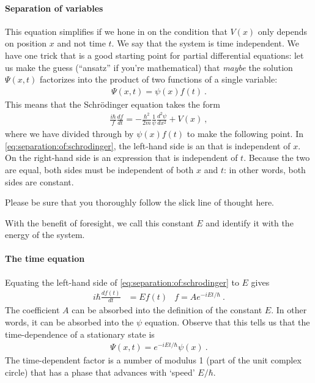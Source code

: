 \paragraph{Separation of variables} This equation simplifies if we hone in on the condition that $V(x)$ only depends on position $x$ and not time $t$. We say that the system is time independent. We have one trick that is a good starting point for partial differential equations: let us make the guess (``ansatz'' if you're mathematical) that \emph{maybe} the solution $\Psi(x,t)$ factorizes into the product of two functions of a single variable:
\begin{align}
    \Psi(x,t) = \psi(x) f(t) \ .
\end{align}
This means that the Schr\"odinger equation takes the form
\begin{align}
    \frac{i\hbar}{f}\frac{df}{dt} = -\frac{\hbar^2}{2m} \frac{1}{\psi}\frac{d^2\psi}{dx^2} + V(x) \ ,
    \label{eq:separation:of:schrodinger}
\end{align}
where we have divided through by  $\psi(x)f(t)$ to make the following point. In \eqref{eq:separation:of:schrodinger}, the left-hand side is an that is independent of $x$. On the right-hand side is an expression that is independent of $t$. Because the two are equal, both sides must be independent of both $x$ and $t$: in other words, both sides are constant. 
\begin{bigidea}
Please be sure that you thoroughly follow the slick line of thought here. 
\end{bigidea}
With the benefit of foresight, we call this constant $E$ and identify it with the energy of the system. 

\paragraph{The time equation} Equating the left-hand side of \eqref{eq:separation:of:schrodinger} to $E$ gives
\begin{align}
    i\hbar \frac{df(t)}{dt} &= E f(t)
    &
    f = A e^{-iEt/\hbar} \ .
    \label{eq:TISE:infinite:f}
\end{align}
The coefficient $A$ can be absorbed into the definition of the constant $E$. In other words, it can be absorbed into the $\psi$ equation. Observe that this tells us that the time-dependence of a stationary state is
\begin{align}
    \Psi(x,t) = e^{-iEt/\hbar} \psi(x) \ .
\end{align}
The time-dependent factor is a number of modulus 1 (part of the unit complex circle) that has a phase that advances with `speed' $E/\hbar$. 

